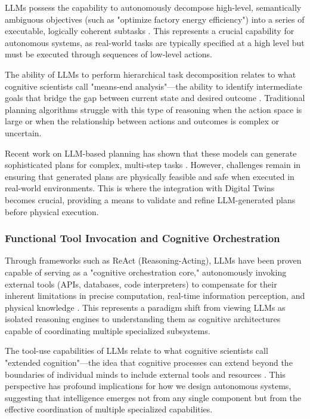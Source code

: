 LLMs possess the capability to autonomously decompose high-level, semantically ambiguous objectives (such as "optimize factory energy efficiency") into a series of executable, logically coherent subtasks \cite{huang2022language, ahn2022can}. This represents a crucial capability for autonomous systems, as real-world tasks are typically specified at a high level but must be executed through sequences of low-level actions.

The ability of LLMs to perform hierarchical task decomposition relates to what cognitive scientists call "means-end analysis"—the ability to identify intermediate goals that bridge the gap between current state and desired outcome \cite{newell1972human, anderson1993rules}. Traditional planning algorithms struggle with this type of reasoning when the action space is large or when the relationship between actions and outcomes is complex or uncertain.

Recent work on LLM-based planning has shown that these models can generate sophisticated plans for complex, multi-step tasks \cite{valmeekam2022large, pallagani2023planbench}. However, challenges remain in ensuring that generated plans are physically feasible and safe when executed in real-world environments. This is where the integration with Digital Twins becomes crucial, providing a means to validate and refine LLM-generated plans before physical execution.

\subsubsection{Functional Tool Invocation and Cognitive Orchestration}

Through frameworks such as ReAct (Reasoning-Acting), LLMs have been proven capable of serving as a "cognitive orchestration core," autonomously invoking external tools (APIs, databases, code interpreters) to compensate for their inherent limitations in precise computation, real-time information perception, and physical knowledge \cite{yao2022react, schick2023toolformer}. This represents a paradigm shift from viewing LLMs as isolated reasoning engines to understanding them as cognitive architectures capable of coordinating multiple specialized subsystems.

The tool-use capabilities of LLMs relate to what cognitive scientists call "extended cognition"—the idea that cognitive processes can extend beyond the boundaries of individual minds to include external tools and resources \cite{clark1998extended, clark2010supersizing}. This perspective has profound implications for how we design autonomous systems, suggesting that intelligence emerges not from any single component but from the effective coordination of multiple specialized capabilities.

